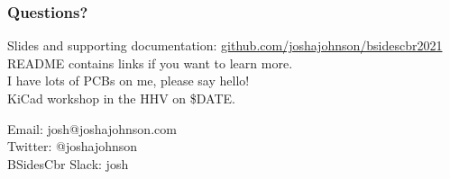 \documentclass[aspectratio=169, t]{beamer}
\begin{document}
\begin{frame}
\frametitle{Questions?}
Slides and supporting documentation: \url{github.com/joshajohnson/bsidescbr2021}\\[10pt]
README contains links if you want to learn more.\\[10pt]
I have lots of PCBs on me, please say hello!\\[10pt]
KiCad workshop in the HHV on \$DATE.
\vspace{5mm}

Email: josh@joshajohnson.com\\
Twitter: @\textunderscore joshajohnson\\
BSidesCbr Slack: josh\\
\vspace{4mm}
\end{frame}
\end{document}
